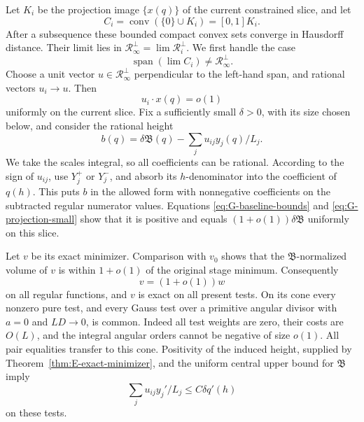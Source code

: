 Let $K_i$ be the projection image $\{x(q)\}$ of the current constrained
slice, and let
\[
                   C_i=\operatorname{conv}(\{0\}\cup K_i)
                       =[0,1]K_i.
\]
After a subsequence these bounded compact convex sets converge in
Hausdorff distance.  Their limit lies in
$\mathcal R_\infty^\perp=\lim\mathcal R_i^\perp$.
We first handle the case
\begin{equation}\label{eq:G-thin}
                      \operatorname{span}(\lim C_i)
                      \ne\mathcal R_\infty^\perp.
\end{equation}
Choose a unit vector $u\in\mathcal R_\infty^\perp$ perpendicular to the
left-hand span, and rational vectors $u_i\to u$.  Then
\begin{equation}\label{eq:G-projection-small}
                    u_i\cdot x(q)=o(1)
\end{equation}
uniformly on the current slice.  Fix a sufficiently small
$\delta>0$, with its size chosen below, and consider the rational height
\begin{equation}\label{eq:G-thin-height}
 b(q)=\delta\mathfrak B(q)-\sum_j u_{ij}y_j(q)/L_j.
\end{equation}
We take the scales integral, so all coefficients can be rational.
According to the sign of $u_{ij}$, use $Y_j^+$ or $Y_j^-$, and absorb its
$h$-denominator into the coefficient of $q(h)$.  This puts $b$ in the
allowed form with nonnegative coefficients on the subtracted regular
numerator values.  Equations \eqref{eq:G-baseline-bounds} and
\eqref{eq:G-projection-small} show that it is positive and equals
$(1+o(1))\delta\mathfrak B$ uniformly on this slice.

Let $v$ be its exact minimizer.  Comparison with $v_0$ shows that the
$\mathfrak B$-normalized volume of $v$ is within $1+o(1)$ of the original
stage minimum.  Consequently
\begin{equation}\label{eq:G-thin-close}
                           v=(1+o(1))w
\end{equation}
on all regular functions, and $v$ is exact on all present tests.
On its cone every nonzero pure test, and every Gauss test over a primitive
angular divisor with $a=0$ and $LD\to0$, is common.  Indeed all test
weights are zero, their costs are $O(L)$, and the integral angular orders
cannot be negative of size $o(1)$.  All pair equalities transfer to this
cone.  Positivity of the induced height, supplied by
Theorem~\ref{thm:E-exact-minimizer}, and the uniform central upper bound for $\mathfrak B$ imply
\begin{equation}\label{eq:G-central-tilt}
                \sum_j u_{ij}y_j'/L_j\le C\delta q'(h)
\end{equation}
on these tests.

